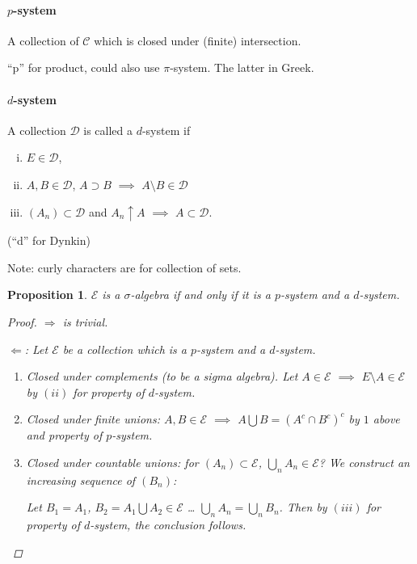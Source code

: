 \documentclass[11pt]{article}
\newtheorem{proposition}[theorem]{Proposition}
\begin{document}
\paragraph{$p$-system} A collection of $\mathcal C$ which is closed under
(finite) intersection.

``p'' for product, could also use $\pi$-system. The latter in Greek. 
\paragraph{$d$-system} A collection $\mathcal D$ is called a $d$-system if 
\begin{enumerate}[(i)]
  \item $E\in \mathcal D$, 
  \item $A, B \in \mathcal D$, $A\supset B$ $\implies$ $A\setminus B \in \mathcal D$
  \item $\left( A_n \right) \subset \mathcal D$ and $A_n \uparrow A$ $\implies$
    $A\subset \mathcal D$. 
\end{enumerate}
(``d'' for Dynkin)




Note: curly characters are for collection of sets. 
\begin{proposition}
  $\mathcal E$ is a $\sigma$-algebra if and only if it is a $p$-system and a
  $d$-system. 
  \begin{proof}
    $\Rightarrow$ is trivial.

    $\Leftarrow$: Let $\mathcal E$ be a collection which is a $p$-system and a
    $d$-system. 
    \begin{enumerate}
      \item Closed under complements (to be a sigma algebra).
        Let $A\in  \mathcal E$ $\implies$ $E\setminus A \in \mathcal E$ by
        $(ii)$ for property of $d$-system. 
      \item Closed under finite unions: $A, B \in \mathcal E$ $\implies$
        $A\bigcup B = \left( A^c \cap B^c \right)^c$ by $1$ above and property
        of $p$-system.
      \item Closed under countable unions: for $\left( A_n \right) \subset
        \mathcal E$, $\bigcup _n A_n \in \mathcal E$? We construct an
        increasing sequence of $\left( B_n \right)$: 

        Let $B_1 = A_1$, $B_2 = A_1 \bigcup A_2 \in \mathcal E$ \dots
        $\bigcup _ n A_n = \bigcup _ n B_n $. Then by $(iii)$ for property of
        $d$-system, the conclusion follows.
    \end{enumerate}
  \end{proof}
  
\end{proposition}
\end{document}
